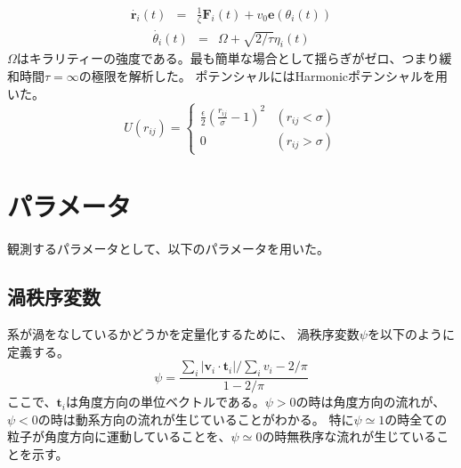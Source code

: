 \documentclass[/Users/ikedahajime/GitHub/reserch/master_report/thesis]{subfiles}
\begin{document}
\begin{eqnarray}
    \dot{\bm{r}_i}(t) &=& \frac{1}{\zeta} \bm{F}_i(t)+v_0 \bm{e}(\theta_i (t))
\end{eqnarray}
\begin{eqnarray}
    \dot{\theta_i }(t) &=& \Omega+\sqrt{2/\tau}\eta_i(t)
\end{eqnarray}
$\Omega$はキラリティーの強度である。最も簡単な場合として揺らぎがゼロ、つまり緩和時間$\tau=\infty$の極限を解析した。
ポテンシャルにはHarmonicポテンシャルを用いた。
\begin{equation}
    U(r_{ij})=
    \begin{cases}
        \frac{\epsilon}{2}\left(\frac{r_{ij}}{\sigma}-1\right)^2 &(r_{ij}<\sigma)\\
        0 & (r_{ij}>\sigma)

    \end{cases}
\end{equation}

\section{パラメータ}
観測するパラメータとして、以下のパラメータを用いた。
\subsection{渦秩序変数}\label{subsec:vortes_order_parameter}
系が渦をなしているかどうかを定量化するために、
渦秩序変数$\psi$\cite{wiolandConfinementStabilizesBacterial2013}を以下のように定義する。
\begin{equation}
    \psi=\frac{\sum_i \left|\bm{v}_i\cdot \bm{t}_i \right|/\sum_i v_i -2/\pi}{1-2/\pi}
\end{equation}
ここで、$\bm{t}_i$は角度方向の単位ベクトルである。$\psi>0$の時は角度方向の流れが、$\psi<0$の時は動系方向の流れが生じていることがわかる。
特に$\psi\simeq1$の時全ての粒子が角度方向に運動していることを、$\psi\simeq0$の時無秩序な流れが生じていることを示す。
\end{document}
